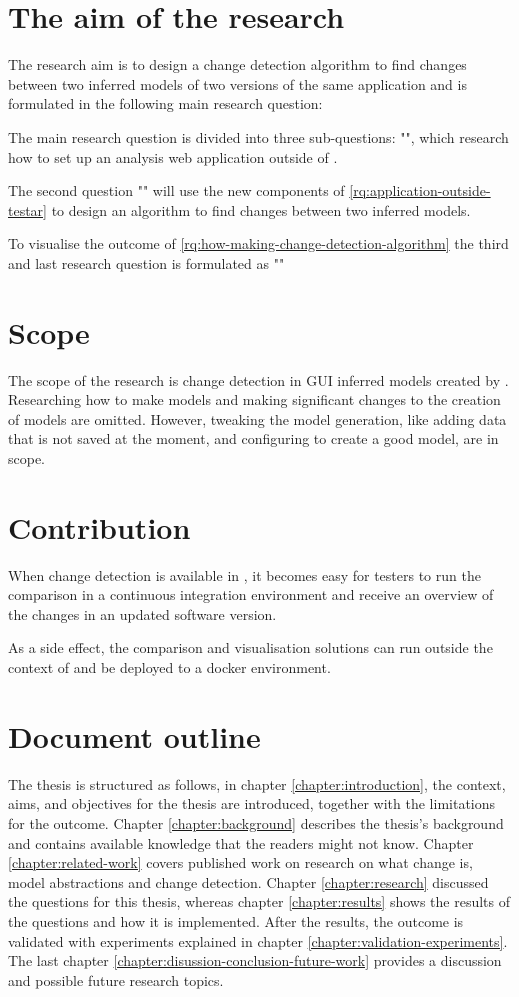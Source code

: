 \section{The aim of the research}
The research aim is to design a change detection algorithm to find changes between two inferred models of two versions of the same application and is formulated in the following main research question:

\textbf{\rqMainQuestion}

The main research question is divided into three sub-questions: "\textit{\rqApplicationOutsideTestar}", which research how to set up an analysis web application outside of \testar. 

The second question "\textit{\rqHowMakingChangeDetectionAlgorithm}" will use the new components of \ref{rq:application-outside-testar} to design an algorithm to find changes between two inferred models. 

To visualise the outcome of \ref{rq:how-making-change-detection-algorithm} the third and last research question is formulated as "\textit{\rqHowToVisualiseResult}"

\section{Scope}
The scope of the research is change detection in GUI inferred models created by \testar. Researching how to make models and making significant changes to the creation of models are omitted. However, tweaking the model generation, like adding data that is not saved at the moment, and configuring \testar to create a good model, are in scope.

\section{Contribution}
When change detection is available in \testar, it becomes easy for testers to run the comparison in a continuous integration environment and receive an overview of the changes in an updated software version.

As a side effect, the comparison and visualisation solutions can run outside the context of \testar and be deployed to a docker environment.

\section{Document outline}
The thesis is structured as follows, in chapter \ref{chapter:introduction}, the context, aims, and objectives for the thesis are introduced, together with the limitations for the outcome. Chapter \ref{chapter:background} describes the thesis's background and contains available knowledge that the readers might not know. Chapter \ref{chapter:related-work} covers published work on research on what change is, model abstractions and change detection. Chapter \ref{chapter:research} discussed the questions for this thesis, whereas chapter \ref{chapter:results} shows the results of the questions and how it is implemented. After the results, the outcome is validated with experiments explained in chapter \ref{chapter:validation-experiments}. The last chapter \ref{chapter:disussion-conclusion-future-work} provides a discussion and possible future research topics.